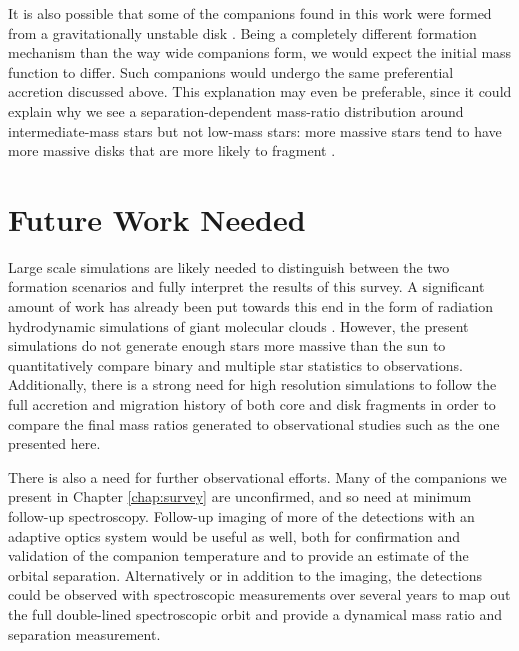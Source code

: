 \documentclass{utthesis}
\begin{document}
It is also possible that some of the companions found in this work were formed from a gravitationally unstable disk \citep[e.g.][]{Kratter2006, Stamatellos2011}. Being a completely different formation mechanism than the way wide companions form, we would expect the initial mass function to differ. Such companions would undergo the same preferential accretion discussed above. This explanation may even be preferable, since it could explain why we see a separation-dependent mass-ratio distribution around intermediate-mass stars but not low-mass stars: more massive stars tend to have more massive disks \citep{Andrews2013} that are more likely to fragment \citep{Kratter2010}.



\section{Future Work Needed}

Large scale simulations are likely needed to distinguish between the two formation scenarios and fully interpret the results of this survey. A significant amount of work has already been put towards this end in the form of radiation hydrodynamic simulations of giant molecular clouds \citep{Bate2012, Krumholz2012}. However, the present simulations do not generate enough stars more massive than the sun to quantitatively compare binary and multiple star statistics to observations. Additionally, there is a strong need for high resolution simulations to follow the full accretion and migration history of both core and disk fragments in order to compare the final mass ratios generated to observational studies such as the one presented here.

There is also a need for further observational efforts. Many of the companions we present in Chapter \ref{chap:survey} are unconfirmed, and so need at minimum follow-up spectroscopy. Follow-up imaging of more of the detections with an adaptive optics system would be useful as well, both for confirmation and validation of the companion temperature and to provide an estimate of the orbital separation. Alternatively or in addition to the imaging, the detections could be observed with spectroscopic measurements over several years to map out the full double-lined spectroscopic orbit and provide a dynamical mass ratio and separation measurement. 








\backmatter

\printindex

\cleardoublepage
{}

\end{document}
